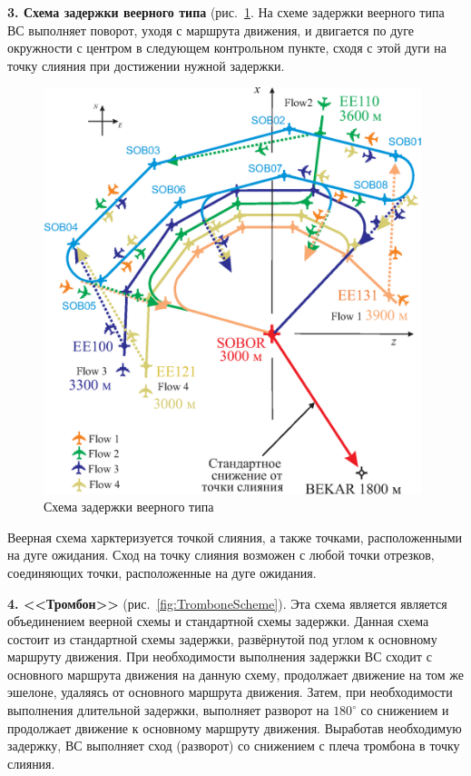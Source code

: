 \documentclass[12pt]{article}
\theoremstyle{plain}
\begin{document}
\textbf{3. Схема задержки веерного типа} (рис.~\ref{fig:VeerScheme}. На схеме задержки веерного типа ВС выполняет поворот, уходя с маршрута движения, и двигается по дуге окружности с центром в следующем контрольном пункте, сходя с этой дуги на точку слияния при достижении нужной задержки. 

\begin{figure}[h]
  \centering

  \includegraphics[width=11cm]{Scheme02_plane.eps}    %

  \caption{Схема задержки веерного типа} 
  \label{fig:VeerScheme}
\end{figure}

Веерная схема харктеризуется точкой слияния, а также точками, расположенными на дуге ожидания. Сход на точку слияния возможен с любой точки отрезков, соединяющих точки, расположенные на дуге ожидания.

\textbf{4. <<Тромбон>>} (рис.~\ref{fig:TromboneScheme}). Эта схема является является объединением веерной схемы и стандартной схемы задержки. Данная схема состоит из стандартной схемы задержки, развёрнутой под углом к основному маршруту движения. При необходимости выполнения задержки ВС сходит с основного маршрута движения на данную схему, продолжает движение на том же эшелоне, удаляясь от основного маршрута движения. Затем, при необходимости выполнения длительной задержки, выполняет разворот на $180^\circ$ со снижением и продолжает движение к основному маршруту движения. Выработав необходимую задержку, ВС выполняет сход (разворот) со снижением с плеча тромбона в точку слияния. 
\end{document}
